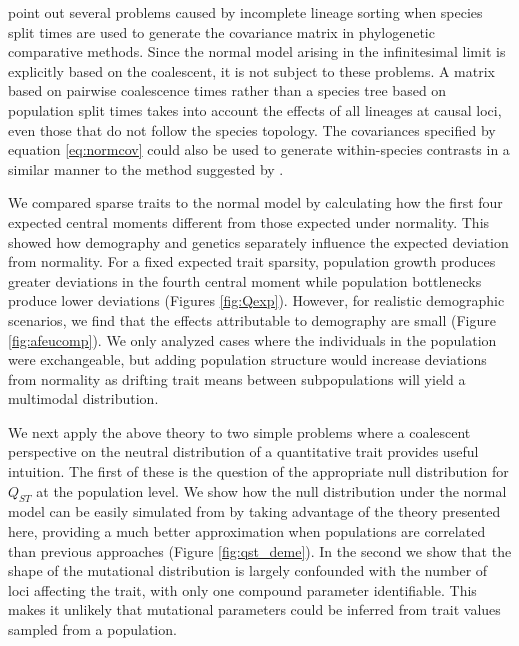 \citet{Mendes2018} point out several problems caused by incomplete
lineage sorting when species split times are used to generate the covariance
matrix in phylogenetic comparative methods. Since the normal model arising in
the infinitesimal limit is explicitly based on the coalescent, it is not subject
to these problems. A matrix based on pairwise coalescence times rather than a
species tree based on population split times takes into account the effects of
all lineages at causal loci, even those that do not follow the species topology.
The covariances specified by equation \eqref{eq:normcov} could also be used to
generate within-species contrasts in a similar manner to the method suggested
by \citet{Felsenstein2002}.

We compared sparse traits to the normal model by calculating how the first four
expected central moments different from those expected under normality. This
showed how demography and genetics separately influence the expected deviation
from normality. For a fixed expected trait sparsity, population growth produces
greater deviations in the fourth central moment while population bottlenecks
produce lower deviations (Figures
\ref{fig:Qexp}). However, for realistic demographic scenarios,
we find that the effects attributable to demography are small (Figure
\ref{fig:afeucomp}). We only analyzed cases where the individuals in the
population were exchangeable, but adding population structure would increase
deviations from normality as drifting trait means between subpopulations will
yield a multimodal distribution.

We next apply the above theory to two simple problems where a coalescent
perspective on the neutral distribution of a quantitative trait provides useful
intuition. The first of these is the question of the appropriate null
distribution for $Q_{ST}$ at the population level. We show how the null
distribution under the normal model can be easily simulated from by taking
advantage of the theory presented here, providing a much better approximation
when populations are correlated than previous approaches \citep{Whitlock2009}
(Figure \ref{fig:qst_deme}). In the second we show that the shape of the
mutational distribution is largely confounded with the number of loci affecting
the trait, with only one compound parameter identifiable. This makes it unlikely
that mutational parameters could be inferred from trait values sampled from a
population.

